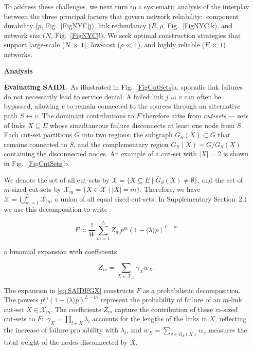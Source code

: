 \documentclass[oneside, a4paper, onecolumn, 11pt]{article}
\newcommand{\av}[1]{\langle #1 \rangle}
\newcommand{\X}{\mathcal X}
\begin{document}
\begin{refsection}
To address these challenges, we next turn to a systematic analysis of the interplay between the three principal factors that govern network reliability:\ component durability ($p$, Fig.\ \ref{FigNYC}j), link redundancy ($R,\rho$, Fig.\ \ref{FigNYC}k), and network size ($N$, Fig.\ \ref{FigNYC}l). We seek optimal construction strategies that support large-scale ($N \gg 1$), low-cost ($\rho \ll 1$), and highly reliable ($F \ll 1$) networks.

\vspace{3mm}
\textbf{\color{blue} \Large Analysis}

\textbf{\color{blue} Evaluating SAIDI}.\ 
As illustrated in Fig.\ \ref{FigCutSets}a, sporadic link failures do not necessarily lead to service denial. A failed link $j \nleftrightarrow v$ can often be bypassed, allowing $v$ to remain connected to the sources through an alternative path $S \leftrightarrow v$. The dominant contributions to $F$ therefore arise from \textit{cut-sets} — sets of links $X \subseteq E$ whose simultaneous failure disconnects at least one node from $S$. Each cut-set partitions $G$ into two regions: the subgraph $G_S(X) \subset G$ that remains connected to $S$, and the complementary region $\overline{G}_S(X) = G / G_S(X)$ containing the disconnected nodes. An example of a cut-set with $|X| = 2$ is shown in Fig.\ \ref{FigCutSets}b. 

We denote the set of all cut-sets by $\X = \{ X \subseteq E \mid \overline{G}_S(X) \ne \emptyset \}$, and the set of $m$-sized cut-sets by $\X_m = \{ X \in \X \mid |X| = m \}$. Therefore, we have $\X = \bigcup_{m = 1}^L \X_m$, a union of all equal sized cut-sets. In Supplementary Section~2.1 we use this decomposition to write~\supercite{rodionov2016practical}

\begin{equation}
F \approx \dfrac{1}{W} \sum_{m = 1}^L Z_m p^m (1 - \av \lambda p)^{L - m}
\label{eq:SAIDIfGX}
\end{equation}

a binomial expansion with coefficients

\begin{equation}
Z_m = \sum_{X \in \X_m} \gamma_X w_X.
\label{Zm}
\end{equation}

The expansion in \eqref{eq:SAIDIfGX} constructs $F$ as a probabilistic decomposition. The powers $p^m(1 - \av \lambda p)^{L - m}$ represent the probability of failure of an $m$-link cut-set $X \in \X_m$. The coefficients $Z_m$ capture the contribution of these $m$-sized cut-sets to $F$:\ $\gamma_X = \prod_{l \in X} \lambda_l$ accounts for the lengths of the links in $X$, reflecting the increase of failure probability with $\lambda_l$, and $w_X = \sum_{v \in \overline{G}_S(X)} w_v$ measures the total weight of the nodes disconnected by $X$.


\end{refsection}
\end{document}
